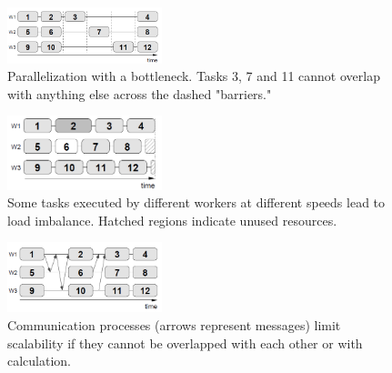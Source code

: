 \begin{figure}[!h]
\centering 
\includegraphics[width=0.4\textwidth]{images/bottlenecks.png}
\caption{Parallelization with a bottleneck. Tasks 3, 7 and 11 cannot overlap with anything else across the dashed "barriers."}
\label{bottlenecks} 
\end{figure}
\begin{figure}[!h]
\centering 
\includegraphics[width=0.4\textwidth]{images/loadbalancing.png}
\caption{Some tasks executed by different workers at different speeds lead to load imbalance. Hatched regions indicate unused resources.}
\label{loadbalancing} 
\end{figure}
\begin{figure}[!h]
\centering 
\includegraphics[width=0.4\textwidth]{images/communication.png}
\caption{Communication processes (arrows represent messages) limit scalability if they cannot be overlapped with each other or with calculation.}
\label{communication} 
\end{figure}

